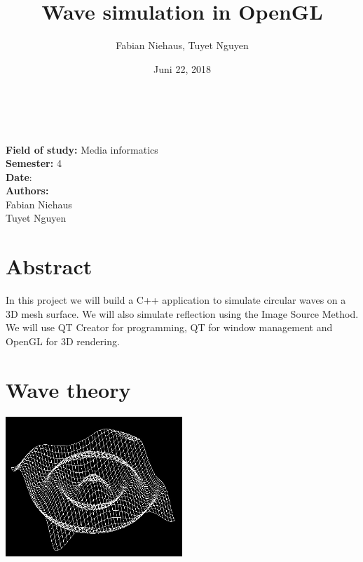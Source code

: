 \documentclass[12pt,a4paper]{scrartcl}
\title{Wave simulation in OpenGL}
\author{Fabian Niehaus, Tuyet Nguyen}
\date{Juni 22, 2018}
\begin{document}
\begin{titlepage}
	\centering
	\ \\[2cm]
	{\huge\textbf{\@title}} 
	\\[3cm]
	\large
	\textbf{Field of study:} Media informatics \\
	\textbf{Semester:} 4
	\\[2cm]
	\textbf{Date}: \@date
	\\[2cm]
	\textbf {Authors:}
	\\Fabian Niehaus
	\\Tuyet Nguyen
\end{titlepage}

\newpage
\setcounter{page}{0}
\tableofcontents
\newpage
\listoffigures

\newpage
\ofoot[]{\pagemark}
\normalsize

\section{Abstract}
In this project we will build a C++ application to simulate circular waves on a 3D mesh surface. We will also simulate reflection using the Image Source Method. We will use QT Creator for programming, QT for window management and OpenGL for 3D rendering.



\section{Wave theory}\label{wave-theory}

\begin{center}
	\includegraphics[width=0.5\textwidth]{Images/Concept.jpg}
\end{center} 
\end{document}
